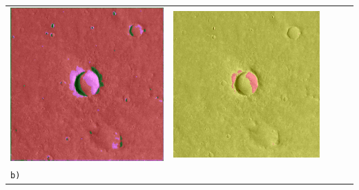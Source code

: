 \begin{table}[h!]
\begin{tabularx}{\textwidth}{>{\centering}m{}
			>{\centering}m{}
			>{\centering}m{}
			>{\centering}m{}
			>{\centering\arraybackslash}m{}}
		\includegraphics[width=0.9\linewidth]{images/gen/fully_connected/p03_01.png_1.png} &
		\includegraphics[width=0.9\linewidth]{images/gen/fully_connected/p03_01.png_2.png} \\
		\texttt{b)} &

\end{tabularx}
\end{table}

